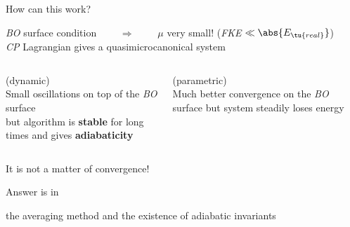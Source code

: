 \begin{frame}{How can this work?}
	\begin{center}
		\emph{BO} surface condition $\qquad \Rightarrow \qquad$ \alert{$\mu$ very small!}
			(\emph{FKE} $\ll \abs{E_\tu{real}}$)\\
			\emph{CP} Lagrangian gives a \alert{quasimicrocanonical system}
	\end{center}
	\begin{columns}[h]
			\begin{flushleft}
				 (dynamic)\\
				Small oscillations on top of the \emph{BO} surface \\
				\alert{but}
				algorithm is \textbf{stable} for long times
				and gives \textbf{adiabaticity}
			\end{flushleft}
			\center{}
			\begin{flushright}
				 (parametric)\\
				Much better convergence on the \emph{BO} surface
				\alert{but}
				system steadily loses energy
			\end{flushright}
	\end{columns}
	\vspace*{4ex}
	\begin{center}
		\alert{It is not a matter of convergence!}
	\end{center}
	Answer is in
	\begin{center}
		the \alert{averaging method} and the existence of \alert{adiabatic invariants}
	\end{center}
\end{frame}


